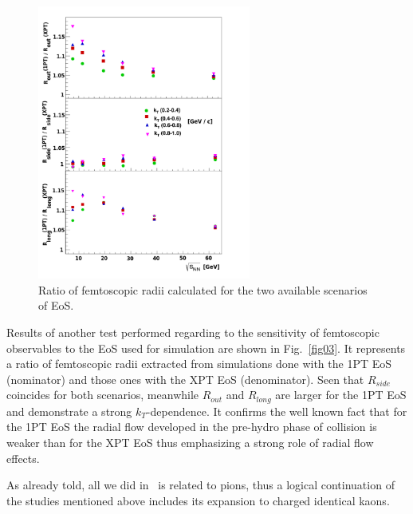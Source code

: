 \documentclass[a4paper]{panl}
\begin{document}
  \begin{figure}[t]
    \begin{center}
      \includegraphics[width=70mm]{fig3.png}
      \vspace{-3mm}
      \caption{Ratio of femtoscopic radii calculated for the two available scenarios of EoS.}
    \end{center}
    \vspace{-5mm}
  \end{figure}
  
 
  Results of another test performed regarding to the sensitivity of femtoscopic observables to the EoS used for simulation are shown in Fig.~\ref{fig03}.
  It represents a ratio of femtoscopic radii extracted from simulations done with the 1PT EoS (nominator) and those ones with the XPT EoS (denominator).
  Seen that $R_{side}$ coincides for both scenarios, meanwhile $R_{out}$ and $R_{long}$ are larger for the 1PT EoS and demonstrate a strong $k_{T}$-dependence.
  It confirms the well known fact that for the 1PT EoS the radial flow developed in the pre-hydro phase of collision is weaker than for the XPT EoS thus emphasizing a strong role
  of radial flow effects.
    
  As already told, all we did in~\cite{Batyuk:2017smw} is related to pions, thus a logical continuation of the studies mentioned above includes its expansion to charged identical kaons.
  
\end{document}
